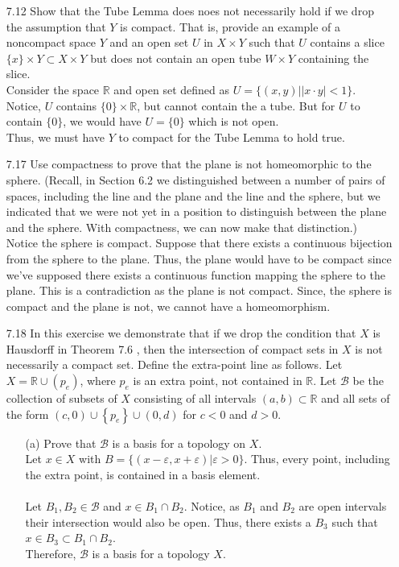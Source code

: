 \documentclass[12pt]{article}
\newcommand{\R}{\mathbb{R}}
\newcommand{\B}{\mathcal{B}}
\begin{document}
\begin{enumerate}
		\item[7.12] Show that the Tube Lemma does noes not necessarily hold if we drop the assumption that $Y$ is compact. That is, provide an example of a noncompact space $Y$ and
		an open set $U$ in $X \times Y$ such that $U$ contains a slice $\{ x \} \times Y \subset X \times Y$ but does not contain an open tube $W \times Y$ containing the slice.\\
		Consider the space $ \R $ and open set defined as $ U = \{(x,y)| |x\cdot y| < 1\} $. Notice, $ U $ contains $ \{0\}\times \R $, but cannot contain the a tube. But for $ U $ to contain $ \{0\} $, we would have $ U =\{0\} $ which is not open.\\
		 Thus, we must have $ Y $ to compact for the Tube Lemma to hold true.
		
		\item[7.17] Use compactness to prove that the plane is not homeomorphic to the sphere.
		(Recall, in Section 6.2 we distinguished between a number of pairs of spaces, including the line and the plane and the line and the sphere, but we indicated that we were not yet in a position to distinguish between the plane and the sphere. With compactness, we can now make that distinction.)\\
		Notice the sphere is compact. Suppose that there exists a continuous bijection from the sphere to the plane. Thus, the plane would have to be compact since we've supposed there exists a continuous function mapping the sphere to the plane. This is a contradiction as the plane is not compact. Since, the sphere is compact and the plane is not, we cannot have a homeomorphism.
		
		\item[7.18] In this exercise we demonstrate that if we drop the condition that $X$ is Hausdorff in Theorem 7.6 , then the intersection of compact sets in $X$ is not necessarily a compact set. Define the extra-point line as follows. Let $X = \mathbb { R } \cup \left( p _ { e } \right)$, where $p _ { e }$ is an extra point, not contained in $\mathbb { R }$. Let $\B$ be the collection of	subsets of $X$ consisting of all intervals $( a , b ) \subset \mathbb { R }$ and all sets of the form $( c , 0 ) \cup \left\{ p _ { e } \right\} \cup ( 0 , d )$ for $c < 0$ and $d > 0$.\\
		\begin{enumerate}
			\item[(a)] Prove that $\mathcal { B }$ is a basis for a topology on $X .$\\
			Let $ x \in X $ with $ B =\{(x-\varepsilon,x+\varepsilon)|\varepsilon > 0\} $. Thus, every point, including the extra point, is contained in a basis element.\\
			\\
			Let $ B_1, B_2 \in \B $ and $ x\in B_1 \cap B_2 $. Notice, as $ B_1 $ and $ B_2 $ are open intervals their intersection would also be open. Thus, there exists a $ B_3 $ such that $ x\in B_3 \subset B_1\cap B_2 $.\\
			Therefore, $ \B $ is a basis for a topology $ X $.
			

\end{enumerate}
\end{enumerate}
\end{document}
